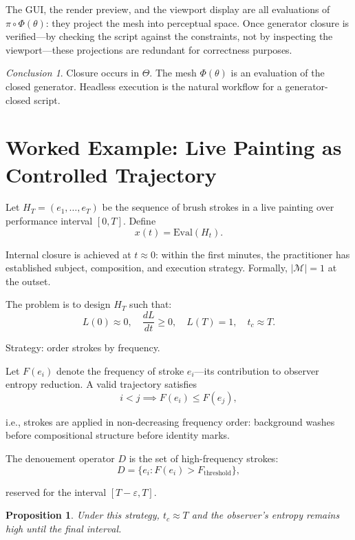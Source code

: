 \documentclass[12pt, twoside]{article}
\theoremstyle{plain}
\newtheorem{proposition}[theorem]{Proposition}
\theoremstyle{definition}
\theoremstyle{remark}
\newtheorem{conclusion}[theorem]{Conclusion}
\begin{document}
The GUI, the render preview, and the viewport display are all evaluations of $\pi \circ \Phi(\theta)$: they project the mesh into perceptual space. Once generator closure is verified---by checking the script against the constraints, not by inspecting the viewport---these projections are redundant for correctness purposes.

\begin{conclusion}
Closure occurs in $\Theta$. The mesh $\Phi(\theta)$ is an evaluation of the closed generator. Headless execution is the natural workflow for a generator-closed script.
\end{conclusion}

\section{Worked Example: Live Painting as Controlled Trajectory}
\label{app:live}

Let $H_T = (e_1, \dots, e_T)$ be the sequence of brush strokes in a live painting over performance interval $[0, T]$. Define
\[
x(t) = \text{Eval}(H_t).
\]

Internal closure is achieved at $t \approx 0$: within the first minutes, the practitioner has established subject, composition, and execution strategy. Formally, $|\mathcal{M}| = 1$ at the outset.

The problem is to design $H_T$ such that:
\[
L(0) \approx 0, \quad \frac{dL}{dt} \geq 0, \quad L(T) = 1, \quad t_c \approx T.
\]

Strategy: order strokes by frequency.

Let $F(e_i)$ denote the frequency of stroke $e_i$---its contribution to observer entropy reduction. A valid trajectory satisfies
\[
i < j \implies F(e_i) \leq F(e_j),
\]

i.e., strokes are applied in non-decreasing frequency order: background washes before compositional structure before identity marks.

The denouement operator $D$ is the set of high-frequency strokes:
\[
D = \{ e_i : F(e_i) > F_{\text{threshold}} \},
\]

reserved for the interval $[T - \varepsilon, T]$.

\begin{proposition}
Under this strategy, $t_c \approx T$ and the observer's entropy remains high until the final interval.
\end{proposition}
\end{document}
